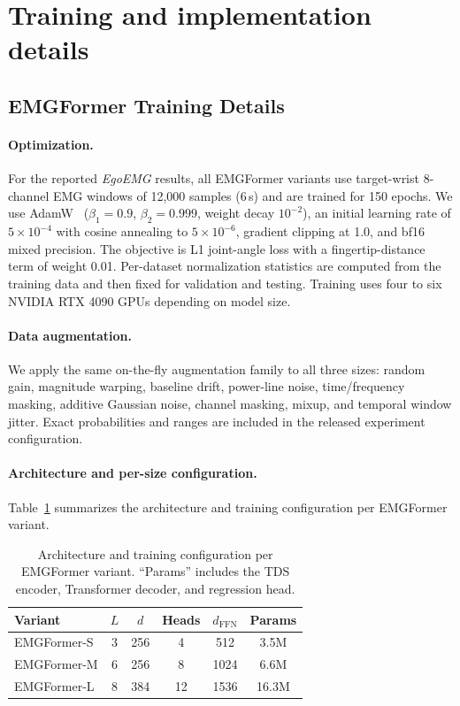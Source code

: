 \documentclass[letterpaper]{article} %
\newcommand{\dataset}{\textit{EgoEMG}}
\newcommand{\model}{EMGFormer}
\begin{document}
\section{Training and implementation details}
\label{app:implementation}

\subsection{EMGFormer Training Details}
\label{app:training_details}

\paragraph{Optimization.}
For the reported \dataset{} results, all \model{} variants use target-wrist
8-channel EMG windows of 12{,}000 samples (6\,s) and are trained for 150
epochs. We use AdamW~\citep{adamw} ($\beta_1=0.9$, $\beta_2=0.999$, weight
decay $10^{-2}$), an initial learning rate of $5\times10^{-4}$ with cosine
annealing to $5\times10^{-6}$, gradient clipping at 1.0, and bf16 mixed
precision. The objective is L1 joint-angle loss with a fingertip-distance term
of weight 0.01. Per-dataset normalization statistics are computed from the
training data and then fixed for validation and testing. Training uses four to
six NVIDIA RTX 4090 GPUs depending on model size.

\paragraph{Data augmentation.}
We apply the same on-the-fly augmentation family to all three sizes: random
gain, magnitude warping, baseline drift, power-line noise, time/frequency
masking, additive Gaussian noise, channel masking, mixup, and temporal window
jitter. Exact probabilities and ranges are included in the released experiment
configuration.

\paragraph{Architecture and per-size configuration.}
Table~\ref{tab:training_config} summarizes the architecture and training configuration per \model{} variant.

\begin{table}[t]
\centering
\caption{Architecture and training configuration per \model{} variant. ``Params'' includes the TDS encoder, Transformer decoder, and regression head.}
\label{tab:training_config}
\footnotesize
\setlength{\tabcolsep}{2.0pt}
\renewcommand{\arraystretch}{1.05}
\begin{tabular}{lccccc}
\toprule
Variant & $L$ & $d$ & Heads & $d_{\mathrm{FFN}}$ & Params \\
\midrule
\model{}-S  & 3 & 256 & 4  & 512  & 3.5M \\
\model{}-M & 6 & 256 & 8  & 1024 & 6.6M \\
\model{}-L  & 8 & 384 & 12 & 1536 & 16.3M \\
\bottomrule
\end{tabular}

\end{table}
\end{document}
